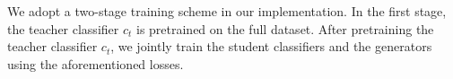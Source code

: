 \documentclass[letterpaper]{article} %
\begin{document}


We adopt a two-stage training scheme in our implementation. In the first stage, the teacher classifier $c_t$ is pretrained on the full dataset. After pretraining the teacher classifier $c_t$, we jointly train the student classifiers and the generators using the aforementioned losses.



\end{document}

